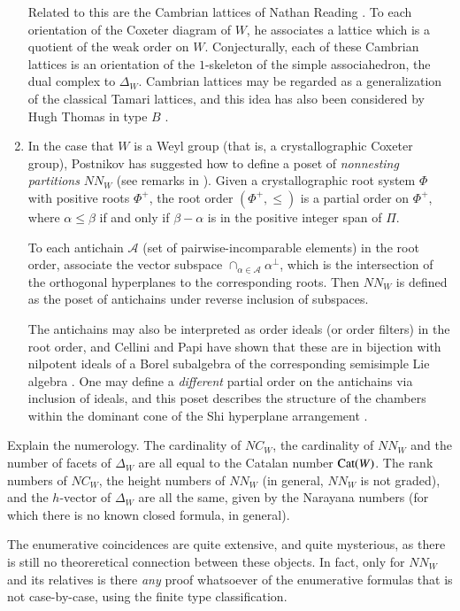 \documentclass[12pt,letterpaper, reqno]{aimpl}
\newcommand{\Cat}{{\rm Cat}}
\newcommand{\A}{\mathcal A}
\begin{document}
\begin{enumerate}
Related to this are the Cambrian lattices of Nathan Reading
\cite{reading:cambrian}. To each orientation of the Coxeter diagram of
$W$, he associates a lattice which is a quotient of the weak order on
$W$. Conjecturally, each of these Cambrian lattices is an orientation
of the $1$-skeleton of the simple associahedron, the dual complex
to $\Delta_W$. Cambrian lattices may be regarded as a generalization of
the classical Tamari lattices, and this idea has also been considered
by Hugh Thomas in type $B$ \cite{thomas}.


\item In the case that $W$ is a Weyl group (that is, a crystallographic
Coxeter group), Postnikov has suggested how to define a poset of
\emph{nonnesting partitions} $NN_W$ (see remarks in \cite{reiner}). Given
a crystallographic root system $\Phi$ with positive roots $\Phi^+$,
the root order $(\Phi^+,\leq)$ is a partial order on $\Phi^+$,
where $\alpha\leq\beta$ if and only if $\beta-\alpha$ is in the positive
integer span of $\Pi$.

To each antichain $\A$ (set of pairwise-incomparable elements) in
the root order, associate the vector subspace $\cap_{\alpha\in\A}
\alpha^{\perp}$, which is the intersection of the orthogonal hyperplanes
to the corresponding roots. Then $NN_W$ is defined as the poset of
antichains under reverse inclusion of subspaces.

The antichains may also be interpreted as order ideals (or order
filters) in the root order, and Cellini and Papi have shown that these
are in bijection with nilpotent ideals of a Borel subalgebra of the
corresponding semisimple Lie algebra \cite{cellini-papi}. One may define
a \emph{different} partial order on the antichains via inclusion of ideals,
and this poset describes the structure of the chambers within the dominant
cone of the Shi hyperplane arrangement \cite{shi}.

\end{enumerate}

 \begin{problemblock}

\begin{problem}[1.1]
\label{central:one}
Explain the numerology. The cardinality of $NC_W$, the cardinality of
$NN_W$ and the number of facets of $\Delta_W$ are all equal to the Catalan
number $\Cat(W)$. The rank numbers of $NC_W$, the height numbers of $NN_W$
(in general, $NN_W$ is not graded), and the $h$-vector of $\Delta_W$ are
all the same, given by the Narayana numbers (for which there is no
known closed formula, in general).
\end{problem}

 The enumerative coincidences are quite
extensive, and quite mysterious, as there is  still no theoreretical
connection between these objects.  In fact, only for $NN_W$ and its
relatives is there \emph{any} proof whatsoever of the enumerative formulas
that is not case-by-case, using the finite type classification.
\end{problemblock}
\end{document}
